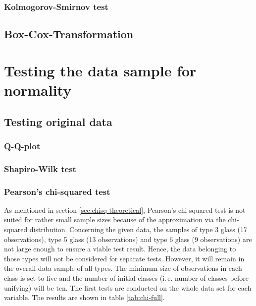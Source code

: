 \documentclass[a4paper, 12pt, titlepage, headsepline, listof = totoc, bibliography = totoc, numbers = noenddot]{scrartcl}
\newcommand{\ie}{i.\,e. }
\begin{document}
\subsubsection{Kolmogorov-Smirnov test}

\subsection{Box-Cox-Transformation}



\newpage
\section{Testing the data sample for normality}

\subsection{Testing original data}

\subsubsection{Q-Q-plot}

\subsubsection{Shapiro-Wilk test}

\subsubsection{Pearson's chi-squared test}
As mentioned in section \ref{sec:chisq-theoretical}, Pearson's chi-squared test is not suited for rather small sample sizes because of the approximation via the chi-squared distribution. Concerning the given data, the samples of type 3 glass (17 observations), type 5 glass (13 observations) and type 6 glass (9 observations) are not large enough to ensure a viable test result. Hence, the data belonging to those types will not be considered for separate tests. However, it will remain in the overall data sample of all types. The minimum size of observations in each class is set to five and the number of initial classes (\ie number of classes before unifying) will be ten. The first tests are conducted on the whole data set for each variable. The results are shown in table \ref{tab:chi-full}.
\end{document}
